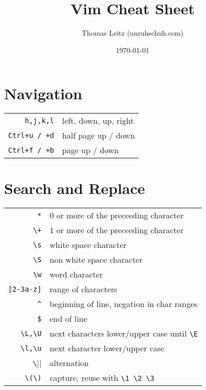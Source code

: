 

\title{Vim Cheat Sheet}
\author{Thomas Leitz (unruhschuh.com)}
\date{\today}



\raggedcolumns

\begin{multicols*}{3}
  
\maketitle
\centering
\section*{Navigation}
\begin{tabular}{@{}rl@{}}
\verb|h,j,k,l|     & left, down, up, right \\
\verb|Ctrl+u / +d| & half page up / down \\
\verb|Ctrl+f / +b| & page up / down
\end{tabular}

\section*{Search and Replace}
\begin{tabular}{@{}rl@{}}
\verb|*|        & 0 or more of the preceeding character \\
\verb|\+|       & 1 or more of the preceeding character \\
\verb|\s|       & white space character \\
\verb|\S|       & non white space character \\
\verb|\w|       & word character \\
\verb|[2-3a-z]| & range of characters \\
\verb|^|        & beginning of line, negation in char ranges \\
\verb|$|        & end of line \\
\verb|\L,\U|    & next characters lower/upper case until \verb|\E| \\
\verb|\l,\u|    & next character lower/upper case \\
\verb|\||       & alternation \\
\verb|\(\)|     & capture, reuse with \verb|\1 \2 \3|
\end{tabular}

\end{multicols*}



